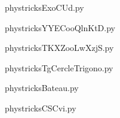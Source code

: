     \newcommand{\CaptionFigExoCUd}{<+Type your caption here+>}
    \begin{center}
        
    \end{center}
    phystricksExoCUd.py

    

    \clearpage
    


    \newcommand{\CaptionFigYYECooQlnKtD}{<+Type your caption here+>}
    \begin{center}
        
    \end{center}
    phystricksYYECooQlnKtD.py

    

    \clearpage
    


    \newcommand{\CaptionFigTKXZooLwXzjS}{<+Type your caption here+>}
    \begin{center}
        
    \end{center}
    phystricksTKXZooLwXzjS.py

    

    \clearpage
    


    \newcommand{\CaptionFigTgCercleTrigono}{<+Type your caption here+>}
    \begin{center}
        
    \end{center}
    phystricksTgCercleTrigono.py

    

    \clearpage
    


    \newcommand{\CaptionFigBateau}{<+Type your caption here+>}
    \begin{center}
        
    \end{center}
    phystricksBateau.py

    

    \clearpage
    


    \newcommand{\CaptionFigCSCvi}{<+Type your caption here+>}
    \begin{center}
        
    \end{center}
    phystricksCSCvi.py

